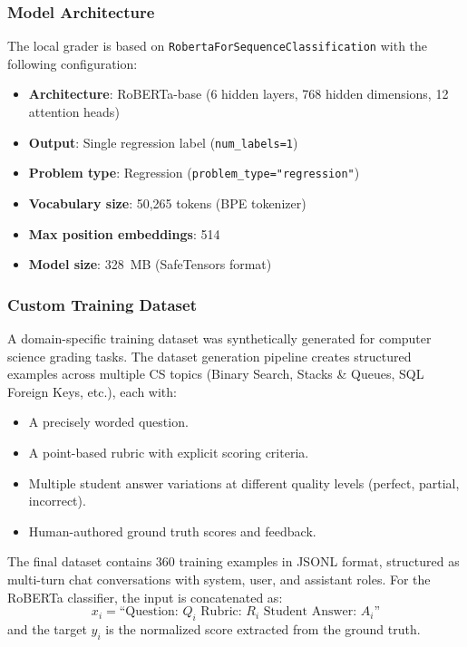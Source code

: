 \documentclass[conference]{IEEEtran}
\begin{document}
\subsubsection{Model Architecture}
The local grader is based on \texttt{RobertaForSequenceClassification} with the following configuration:
\begin{itemize}[leftmargin=*]
    \item \textbf{Architecture}: RoBERTa-base (6 hidden layers, 768 hidden dimensions, 12 attention heads)
    \item \textbf{Output}: Single regression label (\texttt{num\_labels=1})
    \item \textbf{Problem type}: Regression (\texttt{problem\_type="regression"})
    \item \textbf{Vocabulary size}: 50,265 tokens (BPE tokenizer)
    \item \textbf{Max position embeddings}: 514
    \item \textbf{Model size}: 328~MB (SafeTensors format)
\end{itemize}

\subsubsection{Custom Training Dataset}
A domain-specific training dataset was synthetically generated for computer science grading tasks. The dataset generation pipeline creates structured examples across multiple CS topics (Binary Search, Stacks \& Queues, SQL Foreign Keys, etc.), each with:
\begin{itemize}[leftmargin=*]
    \item A precisely worded question.
    \item A point-based rubric with explicit scoring criteria.
    \item Multiple student answer variations at different quality levels (perfect, partial, incorrect).
    \item Human-authored ground truth scores and feedback.
\end{itemize}

The final dataset contains 360 training examples in JSONL format, structured as multi-turn chat conversations with system, user, and assistant roles. For the RoBERTa classifier, the input is concatenated as:
\begin{equation}
x_i = \text{``Question: } Q_i \text{ Rubric: } R_i \text{ Student Answer: } A_i\text{''}
\end{equation}
and the target $y_i$ is the normalized score extracted from the ground truth.
\end{document}
